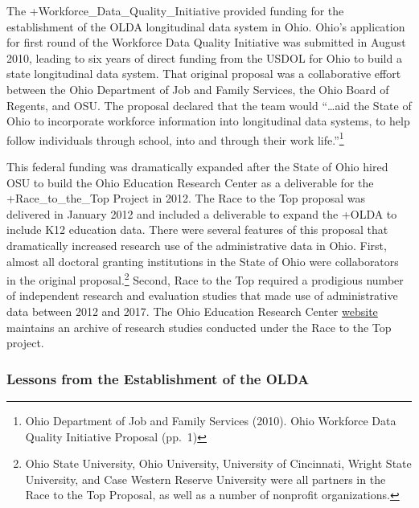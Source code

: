\documentclass[
]{book}
\begin{document}
The +Workforce\_Data\_Quality\_Initiative\textbar{} provided funding for the establishment of the OLDA longitudinal data system in Ohio. Ohio's application for first round of the Workforce Data Quality Initiative was submitted in August 2010, leading to six years of direct funding from the USDOL for Ohio to build a state longitudinal data system. That original proposal was a collaborative effort between the Ohio Department of Job and Family Services, the Ohio Board of Regents, and OSU. The proposal declared that the team would ``\ldots aid the State of Ohio to incorporate workforce information into longitudinal data systems, to help follow individuals through school, into and through their work life.''\footnote{Ohio Department of Job and Family Services (2010). Ohio Workforce Data Quality Initiative Proposal (pp.~1)}

This federal funding was dramatically expanded after the State of Ohio hired OSU to build the Ohio Education Research Center as a deliverable for the +Race\_to\_the\_Top\textbar{} Project in 2012. The Race to the Top proposal was delivered in January 2012 and included a deliverable to expand the +OLDA\textbar{} to include K12 education data. There were several features of this proposal that dramatically increased research use of the administrative data in Ohio. First, almost all doctoral granting institutions in the State of Ohio were collaborators in the original proposal.\footnote{Ohio State University, Ohio University, University of Cincinnati, Wright State University, and Case Western Reserve University were all partners in the Race to the Top Proposal, as well as a number of nonprofit organizations.} Second, Race to the Top required a prodigious number of independent research and evaluation studies that made use of administrative data between 2012 and 2017. The Ohio Education Research Center \href{www.oerc.osu.edu}{website} maintains an archive of research studies conducted under the Race to the Top project.

\hypertarget{lessons-from-the-establishment-of-the-olda}{%
\subsubsection*{Lessons from the Establishment of the OLDA}\label{lessons-from-the-establishment-of-the-olda}}
\end{document}
